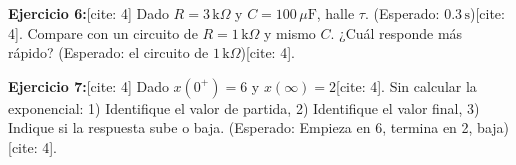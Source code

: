 \documentclass[11pt, a4paper]{article}
\begin{document}
\textbf{Ejercicio 6:}[cite: 4]
Dado $R=3\,\text{k}\Omega$ y $C=100\,\mu\text{F}$, halle $\tau$. (Esperado: $0.3\,\text{s}$)[cite: 4]. Compare con un circuito de $R=1\,\text{k}\Omega$ y mismo $C$. ¿Cuál responde más rápido? (Esperado: el circuito de $1\,\text{k}\Omega$)[cite: 4].

\textbf{Ejercicio 7:}[cite: 4]
Dado $x(0^+) = 6$ y $x(\infty) = 2$[cite: 4]. Sin calcular la exponencial: 1) Identifique el valor de partida, 2) Identifique el valor final, 3) Indique si la respuesta sube o baja. (Esperado: Empieza en 6, termina en 2, baja)[cite: 4].
\end{document}
